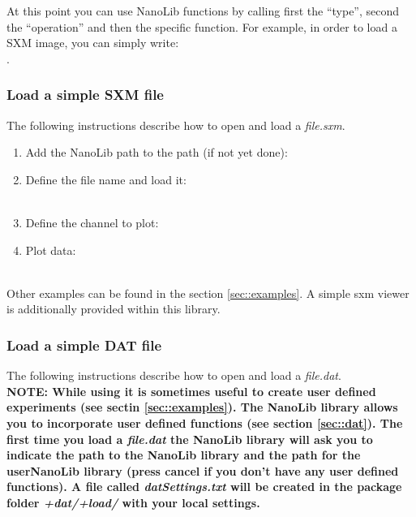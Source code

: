 At this point you can use NanoLib functions by calling first the ``type'', second the ``operation'' and then the specific function. For example, in order to load a SXM image, you can simply write: \\
.

\newpage

\subsubsection{Load a simple SXM file}

The following instructions describe how to open and load a \emph{file.sxm}.

\begin{enumerate}
	\item Add the NanoLib path to the \matlab{} path (if not yet done):\\

	\item Define the file name and load it:\\
	\\
	
	\item Define the channel to plot:\\

	\item Plot data:\\
	\\
	
\end{enumerate}

\noindent Other examples can be found in the section \ref{sec::examples}. A simple sxm viewer is additionally provided within this library.\\

\subsubsection{Load a simple DAT file}

The following instructions describe how to open and load a \emph{file.dat}. \\

\noindent \textbf{NOTE: While using \nanonis{} it is sometimes useful to create user defined experiments (see sectin \ref{sec::examples}). The NanoLib library allows you to incorporate user defined functions (see section \ref{sec::dat}). The first time you load a \emph{file.dat} the NanoLib library will ask you to indicate the path to the NanoLib library and the path for the userNanoLib library (press cancel if you don't have any user defined functions). A file called \emph{datSettings.txt} will be created in the package folder \emph{+dat/+load/} with your local settings.
}

